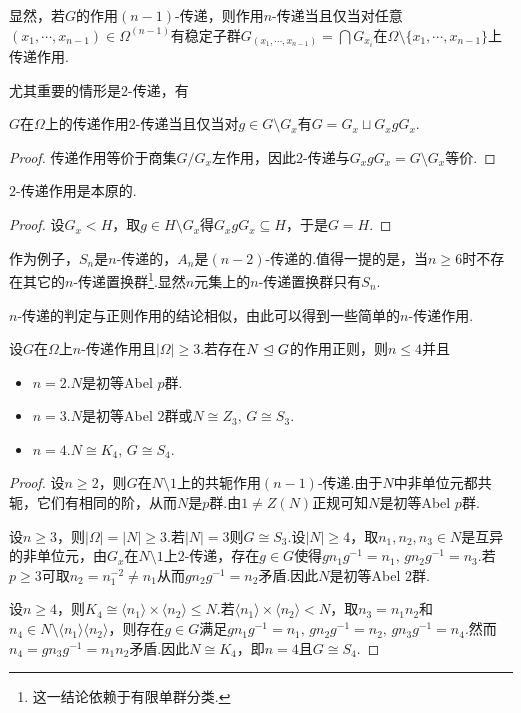 显然，若$G$的作用$(n-1)$-传递，则作用$n$-传递当且仅当对任意$(x_1,\cdots,x_{n-1})\in\Omega^{(n-1)}$有稳定子群$G_{(x_1,\cdots,x_{n-1})}=\bigcap G_{x_i}$在$\Omega\setminus\{x_1,\cdots,x_{n-1}\}$上传递作用.

尤其重要的情形是$2$-传递，有
\begin{lemma*}
	$G$在$\Omega$上的传递作用$2$-传递当且仅当对$g\in G\setminus G_x$有$G=G_x\sqcup G_xgG_x$.\footnotemark
\end{lemma*}
\begin{proof}
	传递作用等价于商集$G/G_x$左作用，因此$2$-传递与$G_xgG_x=G\setminus G_x$等价.
\end{proof}
\begin{prop}
	$2$-传递作用是本原的.
\end{prop}
\begin{proof}
	设$G_x<H$，取$g\in H\setminus G_x$得$G_xgG_x\subseteq H$，于是$G=H$.
\end{proof}

作为例子，$S_n$是$n$-传递的，$A_n$是$(n-2)$-传递的.值得一提的是，当$n\ge 6$时不存在其它的$n$-传递置换群\footnote{这一结论依赖于有限单群分类.}.显然$n$元集上的$n$-传递置换群只有$S_n$.

$n$-传递的判定与正则作用的结论相似，由此可以得到一些简单的$n$-传递作用.
\begin{prop}
	设$G$在$\Omega$上$n$-传递作用且$|\Omega|\ge 3$.若存在$N\trianglelefteq G$的作用正则，则$n\le 4$并且
	\begin{itemize}
		\item $n=2$.\quad $N$是初等Abel $p$群.
		\item $n=3$.\quad $N$是初等Abel $2$群或$N\cong Z_3,\,G\cong S_3$.
		\item $n=4$.\quad $N\cong K_4,\,G\cong S_4$.
	\end{itemize}
\end{prop}
\begin{proof}
	设$n\ge 2$，则$G$在$N\setminus 1$上的共轭作用$(n-1)$-传递.由于$N$中非单位元都共轭，它们有相同的阶，从而$N$是$p$群.由$1\ne Z(N)$正规可知$N$是初等Abel $p$群.

	设$n\ge 3$，则$|\Omega|=|N|\ge 3$.若$|N|=3$则$G\cong S_3$.设$|N|\ge 4$，取$n_1,n_2,n_3\in N$是互异的非单位元，由$G_{x}$在$N\setminus 1$上$2$-传递，存在$g\in G$使得$gn_1g^{-1}=n_1,\,gn_2g^{-1}=n_3$.若$p\ge 3$可取$n_2=n_1^{-2}\ne n_1$从而$gn_2g^{-1}=n_2$矛盾.因此$N$是初等Abel $2$群.

	设$n\ge 4$，则$K_4\cong\langle n_1\rangle\times\langle n_2\rangle\le N$.若$\langle n_1\rangle\times\langle n_2\rangle <N$，取$n_3=n_1n_2$和$n_4\in N\setminus\langle n_1\rangle\langle n_2\rangle $，则存在$g\in G$满足$gn_1g^{-1}=n_1,\,gn_2g^{-1}=n_2,\,gn_3g^{-1}=n_4$.然而$n_4=gn_3g^{-1}=n_1n_2$矛盾.因此$N\cong K_4$，即$n=4$且$G\cong S_4$.
\end{proof}

